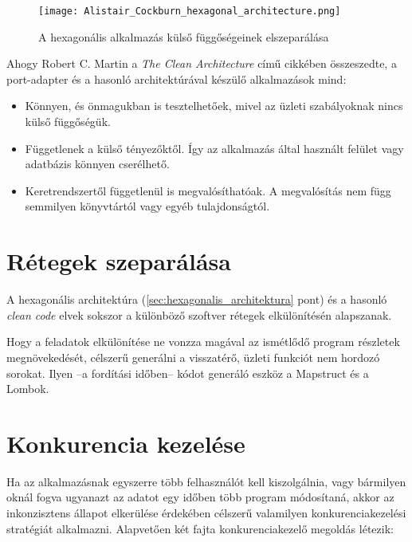 \begin{figure}[hbt] 
	\centering
	\texttt{[image: Alistair\_Cockburn\_hexagonal\_architecture.png]}
	\caption[Hexagonális alkalmazások felépítése]{
		A hexagonális alkalmazás külső függőségeinek elszeparálása}
	\label{fig:Alistair_Cockburn_hexagonal_architecture}
\end{figure}



Ahogy \foreignlanguage{british}{Robert C. Martin} a \foreignlanguage{british}{\textit{The Clean Architecture}} című cikkében \cite{The_Clean_Architecture} összeszedte, a port-adapter és a hasonló architektúrával készülő alkalmazások mind:	
\begin{itemize}
	\item Könnyen, és önmagukban is tesztelhetőek, mivel az üzleti szabályoknak nincs külső függőségük.
	
	\item Függetlenek a külső tényezőktől. Így az alkalmazás által használt felület vagy adatbázis könnyen cserélhető.
	
	\item Keretrendszertől függetlenül is megvalósíthatóak. A megvalósítás nem függ semmilyen könyvtártól vagy egyéb tulajdonságtól.
\end{itemize}
	


\section{Rétegek szeparálása}\label{sec:retegek_szeparalasa}
A hexagonális architektúra (\ref{sec:hexagonalis_architektura} pont) és a hasonló \textit{clean code} \cite{clean_code_chapter_systems} elvek sokszor a különböző szoftver rétegek elkülönítésén alapszanak.


Hogy a feladatok elkülönítése ne vonzza magával az ismétlődő program részletek megnövekedését, célszerű generálni a visszatérő, üzleti funkciót nem hordozó sorokat. Ilyen --a fordítási időben-- kódot generáló eszköz a Mapstruct és a Lombok.


\section{Konkurencia kezelése}\label{sec:konkurencia_kezekese}
Ha az alkalmazásnak egyszerre több felhasználót kell kiszolgálnia, vagy bármilyen oknál fogva ugyanazt az adatot egy időben több program módosítaná, akkor az inkonzisztens állapot elkerülése érdekében célszerű valamilyen konkurenciakezelési stratégiát alkalmazni. Alapvetően két fajta konkurenciakezelő megoldás létezik:

